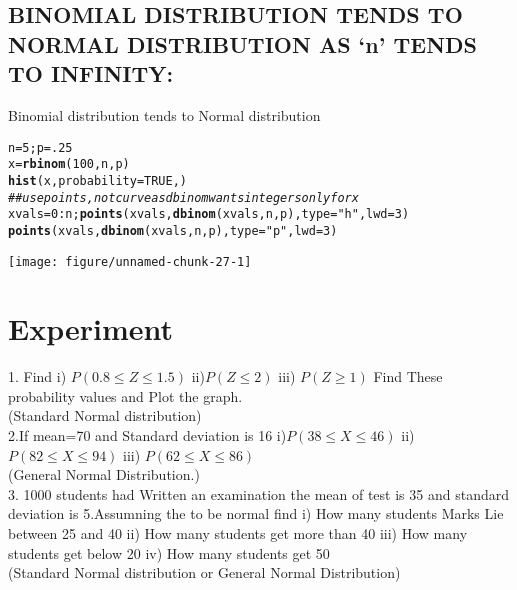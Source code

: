 \documentclass{article}\usepackage[]{graphicx}\usepackage[]{xcolor}
\makeatletter
\def\maxwidth{ %
  \ifdim\Gin@nat@width>\linewidth
    \linewidth
  \else
    \Gin@nat@width
  \fi
}
\newcommand{\hlnum}[1]{\textcolor[rgb]{0.686,0.059,0.569}{#1}}%
\newcommand{\hlsng}[1]{\textcolor[rgb]{0.192,0.494,0.8}{#1}}%
\newcommand{\hlcom}[1]{\textcolor[rgb]{0.678,0.584,0.686}{\textit{#1}}}%
\newcommand{\hlopt}[1]{\textcolor[rgb]{0,0,0}{#1}}%
\newcommand{\hldef}[1]{\textcolor[rgb]{0.345,0.345,0.345}{#1}}%
\newcommand{\hlkwb}[1]{\textcolor[rgb]{0.69,0.353,0.396}{#1}}%
\newcommand{\hlkwc}[1]{\textcolor[rgb]{0.333,0.667,0.333}{#1}}%
\newcommand{\hlkwd}[1]{\textcolor[rgb]{0.737,0.353,0.396}{\textbf{#1}}}%
\newenvironment{kframe}{%
 \def\at@end@of@kframe{}%
 \ifinner\ifhmode%
  \def\at@end@of@kframe{\end{minipage}}%
  \begin{minipage}{\columnwidth}%
 \fi\fi%
 \def\FrameCommand##1{\hskip\@totalleftmargin \hskip-\fboxsep
 \colorbox{shadecolor}{##1}\hskip-\fboxsep
     \hskip-\linewidth \hskip-\@totalleftmargin \hskip\columnwidth}%
 \MakeFramed {\advance\hsize-\width
   \@totalleftmargin\z@ \linewidth\hsize
   \@setminipage}}%
 {\par\unskip\endMakeFramed%
 \at@end@of@kframe}
\newenvironment{knitrout}{}{} %
\makeatother
\begin{document}
\subsection{BINOMIAL DISTRIBUTION TENDS TO NORMAL DISTRIBUTION AS ‘n’ TENDS TO INFINITY:}
Binomial distribution tends to Normal distribution
\begin{knitrout}
\color{fgcolor}\begin{kframe}
\begin{alltt}
\hldef{n}\hlkwb{=}\hlnum{5}\hldef{;p}\hlkwb{=}\hlnum{.25}
\hldef{x}\hlkwb{=}\hlkwd{rbinom}\hldef{(}\hlnum{100}\hldef{,n,p)}
\hlkwd{hist}\hldef{(x,}\hlkwc{probability}\hldef{=}\hlnum{TRUE}\hldef{,)}
 \hlcom{## use points, not curve as dbinom wants integers only for x}
\hldef{xvals}\hlkwb{=}\hlnum{0}\hlopt{:}\hldef{n;}\hlkwd{points}\hldef{(xvals,}\hlkwd{dbinom}\hldef{(xvals,n,p),}\hlkwc{type}\hldef{=}\hlsng{"h"}\hldef{,}\hlkwc{lwd}\hldef{=}\hlnum{3}\hldef{)}
\hlkwd{points}\hldef{(xvals,}\hlkwd{dbinom}\hldef{(xvals,n,p),}\hlkwc{type}\hldef{=}\hlsng{"p"}\hldef{,}\hlkwc{lwd}\hldef{=}\hlnum{3}\hldef{)}
\end{alltt}
\end{kframe}
\texttt{[image: figure/unnamed-chunk-27-1]} 
\end{knitrout}

\section*{Experiment}

1. Find i) $P(0.8\leq Z\leq 1.5)$ ii)$P(Z\leq 2)$ iii) $P(Z \geq 1)$
Find These probability values and Plot the graph.\\
(Standard Normal distribution)\\
2.If mean=70 and Standard deviation is 16
i)$P(38\leq X \leq 46)$  ii) $P(82\leq X \leq 94)$  iii) $P(62\leq X \leq 86)$\\
(General Normal Distribution.)\\
3. 1000 students had Written an examination the mean of test is 35 and
standard deviation is 5.Assumning the to be normal find
i) How many students Marks Lie between 25 and 40
ii) How many students get more than 40
iii) How many students get below 20
iv) How many students get 50\\
(Standard Normal distribution or General Normal Distribution)\\
\end{document}
